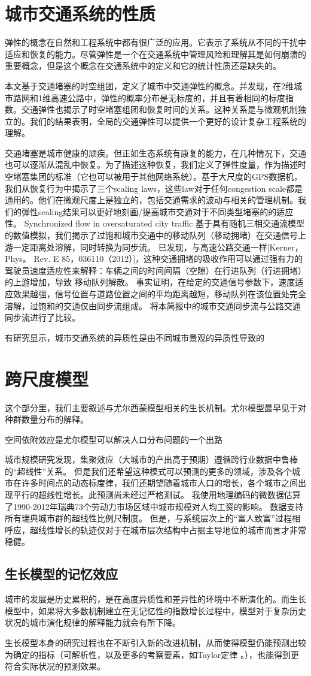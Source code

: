 \section{城市交通系统的性质}

弹性的概念在自然和工程系统中都有很广泛的应用。它表示了系统从不同的干扰中适应和恢复的能力。尽管弹性是一个在交通系统中管理风险和理解其是如何崩溃的重要概念，但是这个概念在交通系统中的定义和它的统计性质还是缺失的。

本文基于交通堵塞的时空组团，定义了城市中交通弹性的概念。并发现，在2维城市路网和1维高速公路中，弹性的概率分布是无标度的，并且有着相同的标度指数。交通弹性也揭示了时空堵塞组团和恢复时间的关系。这种关系是与微观机制独立的。我们的结果表明，全局的交通弹性可以提供一个更好的设计复杂工程系统的理解。

交通堵塞是城市健康的顽疾。但正如生态系统有康复的能力，在几种情况下，交通也可以逐渐从混乱中恢复。为了描述这种恢复，我们定义了弹性度量，作为描述时空堵塞集团的标准（它也可以被用于其他网络系统）。基于大尺度的GPS数据机，我们从恢复行为中揭示了三个scaling laws，这些law对于任何congestion scale都是通用的。他们在微观尺度上是独立的，包括交通需求的波动与相关的管理机制。我们的弹性scaling结果可以更好地刻画/提高城市交通对于不同类型堵塞的的适应性。
Synchronized flow in oversaturated city traffic
基于具有随机三相交通流模型的数值模拟，我们揭示了过饱和城市交通中的移动队列（移动拥堵）在交通信号上游一定距离处溶解，同时转换为同步流。 已发现，与高速公路交通一样[Kerner，Phys。 Rev. E 85，036110（2012）]，这种交通拥堵的吸收作用可以通过强有力的驾驶员速度适应性来解释：车辆之间的时间间隔（空隙）在行进队列（行进拥堵）的上游增加，导致 移动队列解散。 事实证明，在给定的交通信号参数下，速度适应效果越强，信号位置与道路位置之间的平均距离越短，移动队列在该位置处完全溶解，过饱和的交通仅由同步流组成。 将本简报中的城市交通同步流与公路交通同步流进行了比较。

有研究显示，城市交通系统的异质性是由不同城市景观的异质性导致的\cite{}


\section{跨尺度模型}

这个部分里，我们主要叙述与尤尔西蒙模型相关的生长机制。尤尔模型最早见于对种群数量分布的解释\cite{yule1925ii}。

空间依附效应是尤尔模型可以解决人口分布问题的一个出路\cite{Willis}

城市规模研究发现\cite{Keuschnigg13759}，集聚效应（大城市的产出高于预期）遵循跨行业数据中鲁棒的“超线性”关系。 但是我们还希望这种模式可以预测的更多的领域，涉及各个城市在许多时间点的动态标度律，我们还期望随着城市人口的增长，各个城市之间出现平行的超线性增长。此预测尚未经过严格测试。 我使用地理编码的微数据估算了1990-2012年瑞典73个劳动力市场区域中城市规模对人均工资的影响。 数据支持所有瑞典城市群的超线性比例尺制度。 但是，与系统层次上的“富人致富”过程相呼应，超线性增长的轨迹仅对于在城市层次结构中占据主导地位的城市而言才非常稳健。

\subsection{生长模型的记忆效应}

城市的发展是历史累积的，是在高度异质性和差异性的环境中不断演化的。而生长模型中，如果将大多数机制建立在无记忆性的指数增长过程中，模型对于复杂历史状况的城市演化规律的解释能力就会有所下降。

生长模型本身的研究过程也在不断引入新的改进机制，从而使得模型仍能预测出较为确定的指标（可解析性，以及更多的考察要素，如Taylor定律\cite{Giometto7755} 。），也能得到更符合实际状况的预测效果。